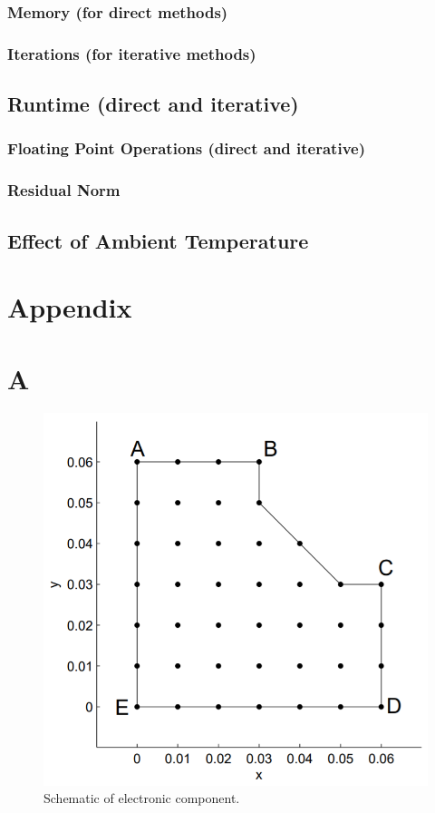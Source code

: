 \documentclass[12pt,a4paper]{article}
\begin{document}
\subsubsection{Memory (for direct methods)}

\subsubsection{Iterations (for iterative methods)}

\subsection{Runtime (direct and iterative)}

\subsubsection{Floating Point Operations (direct and iterative)}

\subsubsection{Residual Norm}

\subsection{Effect of Ambient Temperature}

\clearpage
\section{Appendix}
\section*{A}
\begin{figure}[h!]
	\includegraphics[width=\linewidth]{images/Component.png}
	\caption{Schematic of electronic component.}
	\label{fig:componentSchematic2}
\end{figure}
\end{document}
